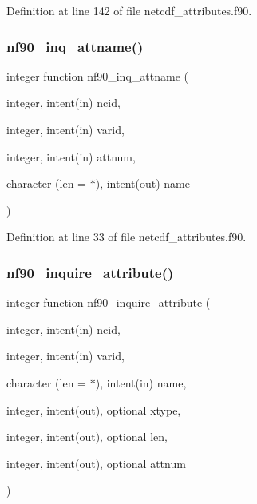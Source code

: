 Definition at line 142 of file netcdf\+\_\+attributes.\+f90.

\mbox{\label{netcdf__attributes_8f90_a16736efbe930d375cd123601cbbd309e}} 
\subsubsection{\texorpdfstring{nf90\+\_\+inq\+\_\+attname()}{nf90\_inq\_attname()}}
{\footnotesize\ttfamily integer function nf90\+\_\+inq\+\_\+attname (\begin{DoxyParamCaption}\item[{integer, intent(in)}]{ncid,  }\item[{integer, intent(in)}]{varid,  }\item[{integer, intent(in)}]{attnum,  }\item[{character (len = $\ast$), intent(out)}]{name }\end{DoxyParamCaption})}



Definition at line 33 of file netcdf\+\_\+attributes.\+f90.

\mbox{\label{netcdf__attributes_8f90_a659f290308e8a5d27164dc45b0454bac}} 
\subsubsection{\texorpdfstring{nf90\+\_\+inquire\+\_\+attribute()}{nf90\_inquire\_attribute()}}
{\footnotesize\ttfamily integer function nf90\+\_\+inquire\+\_\+attribute (\begin{DoxyParamCaption}\item[{integer, intent(in)}]{ncid,  }\item[{integer, intent(in)}]{varid,  }\item[{character (len = $\ast$), intent(in)}]{name,  }\item[{integer, intent(out), optional}]{xtype,  }\item[{integer, intent(out), optional}]{len,  }\item[{integer, intent(out), optional}]{attnum }\end{DoxyParamCaption})}



